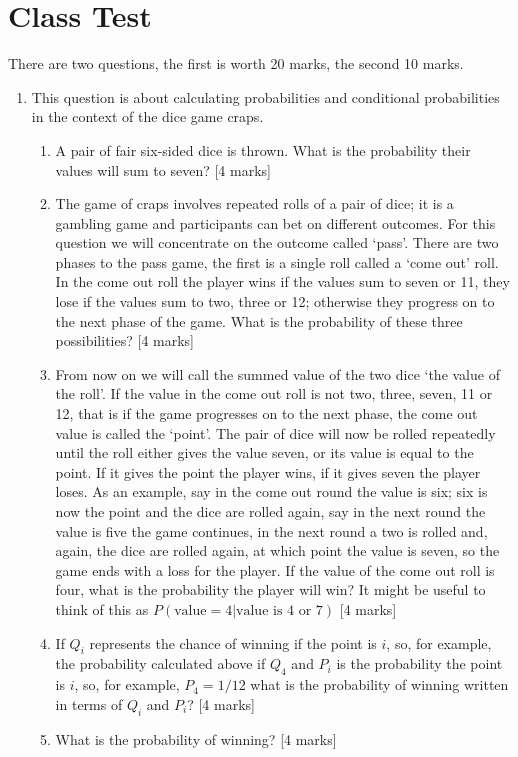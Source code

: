 \documentclass[11pt,a4paper]{scrartcl}
\begin{document}
\section*{Class Test}

There are two questions, the first is worth 20 marks, the second 10 marks.

\begin{enumerate}

\item This question is about calculating probabilities and conditional probabilities in the context of the dice game craps.

\begin{enumerate}
  \item A pair of fair six-sided dice is thrown. What is the probability their values will sum to seven? [4 marks]
  \item The game of craps involves repeated rolls of a pair of dice; it is a gambling game and participants can bet on different outcomes. For this question we will concentrate on the outcome called \lq{}pass\rq{}. There are two phases to the pass game, the first is a single roll called a \lq{}come out\rq{} roll. In the come out roll the player wins if the values sum to seven or 11, they lose if the values sum to two, three or 12; otherwise they progress on to the next phase of the game. What is the probability of these three possibilities?  [4 marks]
  \item From now on we will call the summed value of the two dice \lq{}the value of the roll\rq{}. If the value in the come out roll is not two, three, seven, 11 or 12, that is if the game progresses on to the next phase, the come out value is called the \lq{}point\rq{}. The pair of dice will now be  rolled repeatedly until the roll either gives the value seven, or its value is equal to the point. If it gives the point the player wins, if it gives seven the player loses. As an example, say in the come out round the value is six; six is now the point and the dice are rolled again, say in the next round the value is five the game continues, in the next round a two is rolled and, again, the dice are rolled again, at which point the value is seven, so the game ends with a loss for the player. If the value of the come out roll is four, what is the probability the player will win? It might be useful to think of this as $P(\mbox{value}=4|\mbox{value is 4 or 7})$ [4 marks]
  \item If  $Q_i$ represents the chance of winning if the point is $i$, so, for example, the probability calculated above if $Q_4$ and $P_i$ is the probability the point is $i$, so, for example, $P_4=1/12$
what is the probability of winning written in terms of $Q_i$ and $P_i$? [4 marks]
\item What is the probability of winning? [4 marks]


\end{enumerate}
\end{enumerate}
\end{document}
